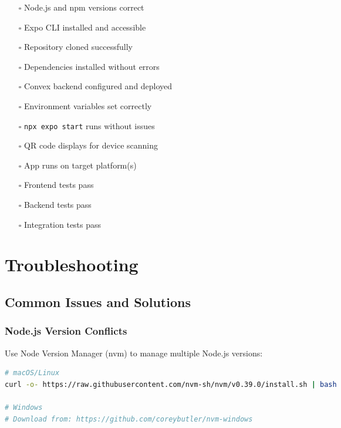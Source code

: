 \documentclass[11pt,a4paper]{article}
\begin{document}
\begin{tcolorbox}[colback=lightgray,colframe=black,title=\textbf{Installation Verification}]
\begin{itemize}[leftmargin=*]
    \item[$\square$] Node.js and npm versions correct
    \item[$\square$] Expo CLI installed and accessible
    \item[$\square$] Repository cloned successfully
    \item[$\square$] Dependencies installed without errors
    \item[$\square$] Convex backend configured and deployed
    \item[$\square$] Environment variables set correctly
    \item[$\square$] \texttt{npx expo start} runs without issues
    \item[$\square$] QR code displays for device scanning
    \item[$\square$] App runs on target platform(s)
    \item[$\square$] Frontend tests pass
    \item[$\square$] Backend tests pass
    \item[$\square$] Integration tests pass
\end{itemize}
\end{tcolorbox}

\section{Troubleshooting}

\subsection{Common Issues and Solutions}

\subsubsection{Node.js Version Conflicts}
Use Node Version Manager (nvm) to manage multiple Node.js versions:

\begin{lstlisting}[language=bash]
# macOS/Linux
curl -o- https://raw.githubusercontent.com/nvm-sh/nvm/v0.39.0/install.sh | bash

# Windows
# Download from: https://github.com/coreybutler/nvm-windows
\end{lstlisting}
\end{document}
